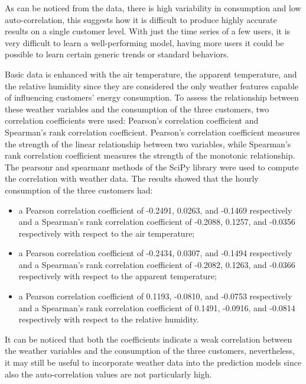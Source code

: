 As can be noticed from the data, there is high variability in consumption and low auto-correlation, this suggests how it is difficult to produce highly accurate results on a single customer level.
With just the time series of a few users, it is very difficult to learn a well-performing model, having more users it could be possible to learn certain generic trends or standard behaviors.

Basic data is enhanced with the air temperature, the apparent temperature, and the relative humidity since they are considered the only weather features capable of influencing customers' energy consumption.
To assess the relationship between these weather variables and the consumption of the three customers, two correlation coefficients were used: Pearson's correlation coefficient and Spearman's rank correlation coefficient.
Pearson's correlation coefficient measures the strength of the linear relationship between two variables, while Spearman's rank correlation coefficient measures the strength of the monotonic relationship.
The pearsonr and spearmanr methods of the SciPy library were used to compute the correlation with weather data.
The results showed that the hourly consumption of the three customers had:
\begin{itemize}
  \item a Pearson correlation coefficient of -0.2491, 0.0263, and -0.1469 respectively and a Spearman's rank correlation coefficient of -0.2088, 0.1257, and -0.0356 respectively with respect to the air temperature;
  \item a Pearson correlation coefficient of -0.2434, 0.0307, and -0.1494 respectively and a Spearman's rank correlation coefficient of -0.2082, 0.1263, and -0.0366 respectively with respect to the apparent temperature;
  \item a Pearson correlation coefficient of 0.1193, -0.0810, and -0.0753 respectively and a Spearman's rank correlation coefficient of 0.1491, -0.0916, and -0.0814 respectively with respect to the relative humidity.
\end{itemize}
It can be noticed that both the coefficients indicate a weak correlation between the weather variables and the consumption of the three customers, nevertheless, it may still be useful to incorporate weather data into the prediction models since also the auto-correlation values are not particularly high.

